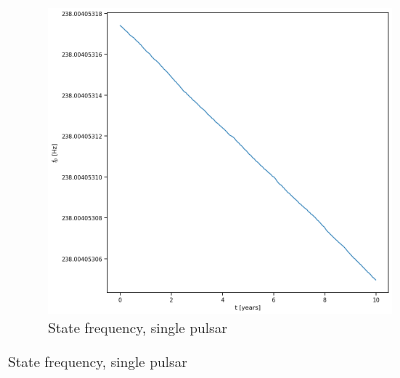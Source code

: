 \documentclass{tufte-handout} %
\begin{document}
\begin{figure}
	\centering
	\begin{subfigure}[b]{0.475\textwidth}
		\centering
		\includegraphics[width=\textwidth]{images/fp1}
		\caption{State frequency, single pulsar}%
		   

\end{subfigure}
\end{figure}
\end{document}
